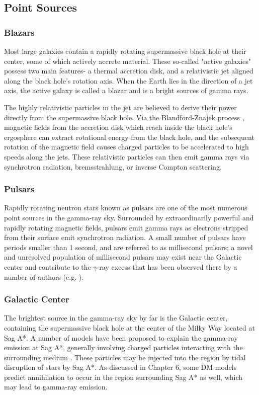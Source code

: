 \subsection{Point Sources}

\subsubsection{Blazars}
Most large galaxies contain a rapidly rotating supermassive black hole at their center, some of which actively accrete material. These so-called "active galaxies" possess two main features- a thermal accretion disk, and a relativistic jet aligned along the black hole's rotation axis. When the Earth lies in the direction of a jet axis, the active galaxy is called a blazar and is a bright sources of gamma rays.

The highly relativistic particles in the jet are believed to derive their power directly from the supermassive black hole. Via the Blandford-Znajek process \cite{blandford_znajek_1977}, magnetic fields from the accretion disk which reach inside the black hole's ergosphere can extract rotational energy from the black hole, and the subsequent rotation of the magnetic field causes charged particles to be accelerated to high speeds along the jets. These relativistic particles can then emit gamma rays via synchrotron radiation, bremsstrahlung, or inverse Compton scattering. 
\subsubsection{Pulsars}
Rapidly rotating neutron stars known as pulsars are one of the most numerous point sources in the gamma-ray sky. Surrounded by extraordinarily powerful and rapidly rotating magnetic fields, pulsars emit gamma rays as electrons stripped from their surface emit synchrotron radiation. A small number of pulsars have periods smaller than 1 second, and are referred to as millisecond pulsars; a novel and unresolved population of millisecond pulsars may exist near the Galactic center and contribute to the $\gamma$-ray excess that has been observed there by a number of authors (e.g. \cite{bhakta_searching_2017}).
\subsubsection{Galactic Center}
	The brightest source in the gamma-ray sky by far is the Galactic center, containing the supermassive black hole at the center of the Milky Way located at Sag A*. A number of models have been proposed to explain the gamma-ray emission at Sag A*, generally involving charged particles interacting with the surrounding medium \cite{van_eldik_gamma_2015}. These particles may be injected into the region by tidal disruption of stars by Sag A*. As discussed in Chapter 6, some DM models predict annihilation to occur in the region surrounding Sag A* as well, which may lead to gamma-ray emission.

